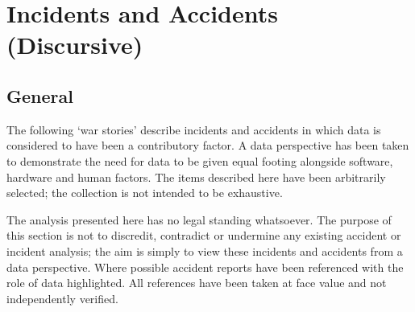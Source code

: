 %
%
\chapter{Incidents and Accidents (Discursive)} \label{bkm:accidents}


\section{General}
The following `war stories' describe incidents and accidents in which data is considered to have been a contributory factor. A data perspective has been taken to demonstrate the need for data to be given equal footing alongside software, hardware and human factors. The items described here have been arbitrarily selected; the collection is not intended to be exhaustive.

 The analysis presented here has no legal standing whatsoever. The purpose of this section is not to discredit, contradict or undermine any existing accident or incident analysis; the aim is simply to view these incidents and accidents from a data perspective. Where possible accident reports have been referenced with the role of data highlighted. All references have been taken at face value and not independently verified.

